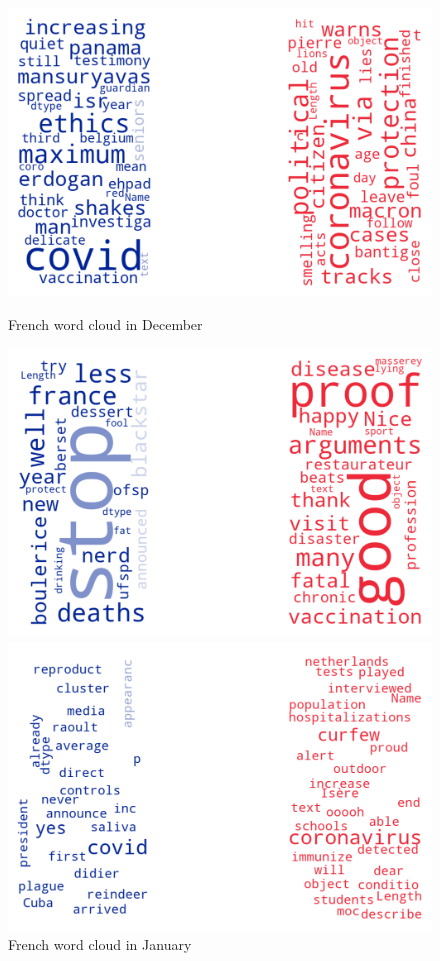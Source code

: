 \begin{landscape}
\newpage

\begin{figure}[!htb]
  \includegraphics[width=\linewidth]{December fr word cloud.png}
  \caption{French word cloud in December}\label{fig:decemberfr}
\endminipage\hfill
{}
  \includegraphics[width=\linewidth]{January fr word cloud.png}
  \caption{French word cloud in January}\label{fig:januaryfr}
\endminipage\hfill
{}
  \includegraphics[width=\linewidth]{February fr word cloud.png}

\end{figure}
\end{landscape}
